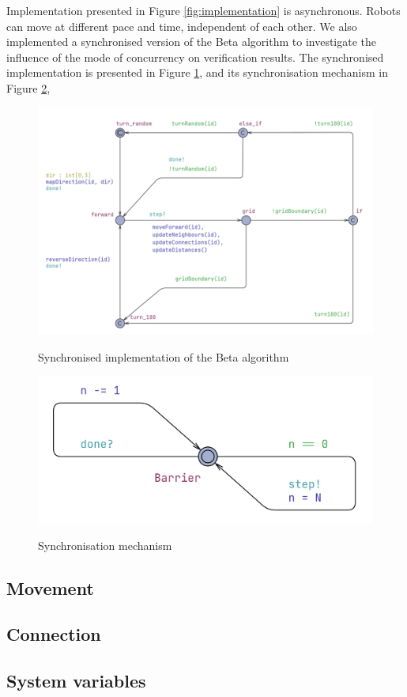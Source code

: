 \noindent
Implementation presented in Figure \ref{fig:implementation} is asynchronous. Robots can move at different pace and time, independent of each other. We also implemented a synchronised version of the Beta algorithm to investigate the influence of the mode of concurrency on verification results. The synchronised implementation is presented in Figure \ref{fig:implementation_synchronised}, and its synchronisation mechanism in Figure \ref{fig:implementation_synchronised_barrier},

\begin{figure}[H]
\caption{Synchronised implementation of the Beta algorithm}
\includegraphics[width=\textwidth]{images/implementation_synchronised.png}
\label{fig:implementation_synchronised}
\end{figure}

\begin{figure}[H]
\caption{Synchronisation mechanism}
\includegraphics[width=\textwidth]{images/implementation_synchronised_barrier.png}
\label{fig:implementation_synchronised_barrier}
\end{figure}

\subsection{Movement}



\subsection{Connection}



\subsection{System variables}
